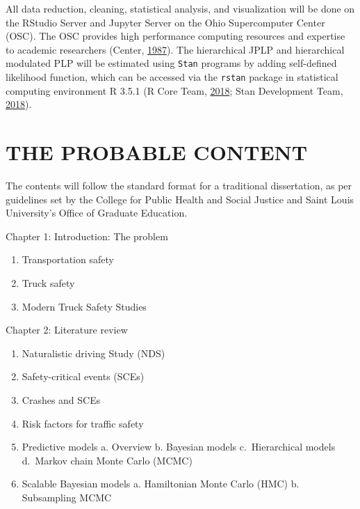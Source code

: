 \documentclass[12pt]{book}
\numberwithin{equation}{chapter}
\providecommand{\tightlist}{%
  \setlength{\itemsep}{0pt}\setlength{\parskip}{0pt}}
\begin{document}
All data reduction, cleaning, statistical analysis, and visualization will be done on the RStudio Server and Jupyter Server on the Ohio Supercomputer Center (OSC). The OSC provides high performance computing resources and expertise to academic researchers (Center, \protect\hyperlink{ref-OSC1987}{1987}). The hierarchical JPLP and hierarchical modulated PLP will be estimated using \texttt{Stan} programs by adding self-defined likelihood function, which can be accessed via the \texttt{rstan} package in statistical computing environment R 3.5.1 (R Core Team, \protect\hyperlink{ref-Rcitation}{2018}; Stan Development Team, \protect\hyperlink{ref-rstancitation}{2018}).

\hypertarget{the-probable-content}{%
\chapter{THE PROBABLE CONTENT}\label{the-probable-content}}

The contents will follow the standard format for a traditional dissertation, as per guidelines set by the College for Public Health and Social Justice and Saint Louis University's Office of Graduate Education.

Chapter 1: Introduction: The problem

\begin{enumerate}
\def\labelenumi{\arabic{enumi}.}
\tightlist
\item
  Transportation safety
\item
  Truck safety
\item
  Modern Truck Safety Studies
\end{enumerate}

Chapter 2: Literature review

\begin{enumerate}
\def\labelenumi{\arabic{enumi}.}
\tightlist
\item
  Naturalistic driving Study (NDS)
\item
  Safety-critical events (SCEs)
\item
  Crashes and SCEs
\item
  Risk factors for traffic safety
\item
  Predictive models
  a. Overview
  b. Bayesian models
  c.~Hierarchical models
  d.~Markov chain Monte Carlo (MCMC)
\item
  Scalable Bayesian models
  a. Hamiltonian Monte Carlo (HMC)
  b. Subsampling MCMC
\end{enumerate}
\end{document}
